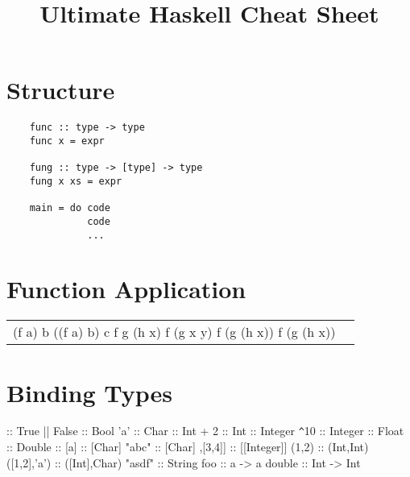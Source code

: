 \documentclass{refcard}
\title{Ultimate Haskell Cheat Sheet}
\begin{document}
\maketitle

\section{Structure}

\begin{verbatim}
	func :: type -> type
	func x = expr

	fung :: type -> [type] -> type
	fung x xs = expr

	main = do code
	          code
	          ...
\end{verbatim}


\section{Function Application}

\begin{tabular}{CC}
	\li[f a b] (f a) b
	\li[f a b c] ((f a) b) c
	\li[f g \$ h x] f g (h x)
	\li[f \$ g x y] f (g x y)
	\li[f \$ g \$ h x] f (g (h x))
	\li[(f . g . h) x] f (g (h x))
\end{tabular}


\section{Binding Types}

\begin{ldesc}
	               \s::\s{}
	\li[boolean]                True || False :: Bool
	\li[character]              'a' :: Char
	 :: Int
	 + 2 :: Int
	 :: Integer
	\verb+^+10 :: Integer
	 :: Float 
	 :: Double
	\li[list]                   [] :: [a]
	\li[]                       ['a','b','c'] :: [Char]
	\li                         "abc" :: [Char]
	\li[]                       [[1,2],[3,4]] :: [[Integer]]
	\li[tuple]                  (1,2) :: (Int,Int)
	\li                         ([1,2],'a') :: ([Int],Char)
	\li[string]                 "asdf" :: String
	\li[functions]              foo :: a -> a
	\li                         double :: Int -> Int
\end{ldesc}
\end{document}
